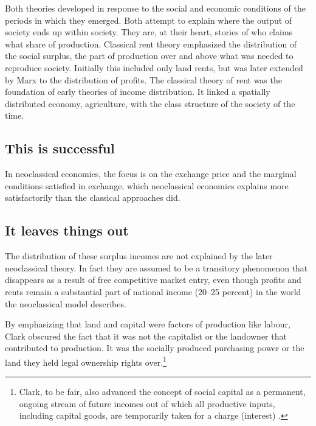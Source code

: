 Both theories developed in response to the social and economic conditions of the periods in which they emerged. Both attempt to explain where the output of society ends up within society. They are, at their heart, stories of who %
claims what share of production. Classical rent theory emphasized the distribution of the social \gls{surplus}, the part of production over and above what was needed to reproduce society. Initially this included only land rents, but was later extended by Marx to the distribution of profits.
The classical theory of rent was the foundation of early %
theories of income distribution. It linked a spatially distributed economy, agriculture, with the class structure of the society of the time. 


\subsection{This is successful}

In neoclassical economics, the focus is on the exchange price and the marginal conditions satisfied in exchange, which neoclassical economics explains more satisfactorily than the classical approaches did.  

\subsection{It leaves things out}


The distribution of these surplus incomes are not explained by the later neoclassical theory. In fact they are assumed to be a transitory phenomenon that disappears as a result of free competitive market entry, even though profits and rents remain a substantial part of national income (20--25 percent) \cite{GET_Britannica} %
in the world the neoclassical model describes. 




By emphasizing that land and capital were factors of production like labour, Clark obscured the fact that it was not the capitalist or the landowner that contributed to production. It was the socially produced purchasing power or the land they held legal ownership rights over.\footnote{Clark, to be fair, also advanced the concept of social capital as a permanent, ongoing stream of future incomes out of which all productive inputs, including capital goods, are temporarily taken for a charge (interest) \cite{CLARKBRITANICA}. %
}

